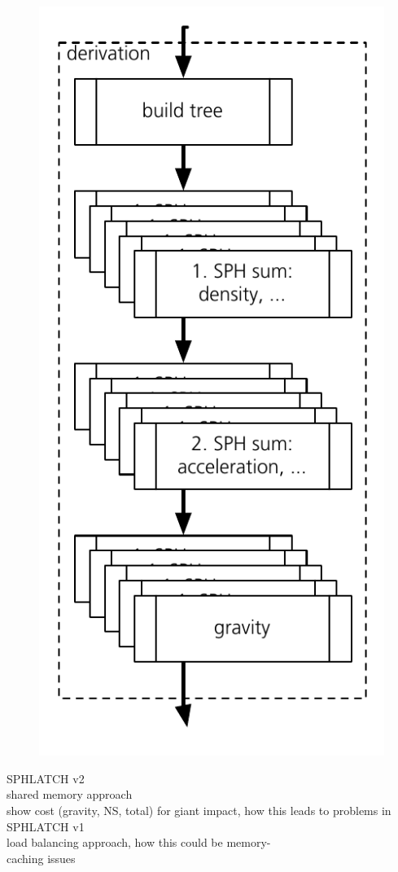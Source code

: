 \begin{figure}[htbp]
\begin{center}
\includegraphics[scale=0.6]{22algo_sphlatch02.pdf}
\caption{}
\label{ch02_grav02_fig12}
\end{center}
\end{figure}


SPHLATCH v2\\
shared memory approach\\
show cost (gravity, NS, total) for giant impact, how this leads to problems in SPHLATCH v1\\
load balancing approach, how this could be memory-\\
caching issues\\


